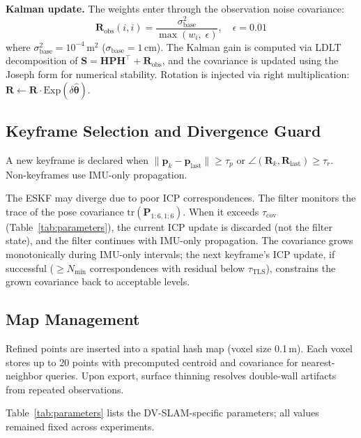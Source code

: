 \documentclass[journal]{IEEEtran}
\begin{document}
\textbf{Kalman update.} The weights enter through the observation noise covariance:
\begin{equation}
    \mathbf{R}_{\text{obs}}(i,i) = \frac{\sigma_{\text{base}}^2}{\max(w_i,\;\epsilon)}, \quad \epsilon = 0.01
    \label{eq:Robs}
\end{equation}
where $\sigma_{\text{base}}^2 = 10^{-4}$\,m$^2$ ($\sigma_{\text{base}} = 1$\,cm). The Kalman gain is computed via LDLT decomposition of $\mathbf{S} = \mathbf{H}\mathbf{P}\mathbf{H}^\top + \mathbf{R}_{\text{obs}}$, and the covariance is updated using the Joseph form for numerical stability. Rotation is injected via right multiplication: $\mathbf{R} \leftarrow \mathbf{R} \cdot \text{Exp}(\delta\hat{\boldsymbol{\theta}})$.

\subsection{Keyframe Selection and Divergence Guard}
\label{sec:divergence}

A new keyframe is declared when $\|\mathbf{p}_k - \mathbf{p}_{\text{last}}\| \geq \tau_p$ or $\angle(\mathbf{R}_k, \mathbf{R}_{\text{last}}) \geq \tau_r$. Non-keyframes use IMU-only propagation.

The ESKF may diverge due to poor ICP correspondences. The filter monitors the trace of the pose covariance $\text{tr}(\mathbf{P}_{1:6,1:6})$. When it exceeds $\tau_{\text{cov}}$ (Table~\ref{tab:parameters}), the current ICP update is discarded (not the filter state), and the filter continues with IMU-only propagation. The covariance grows monotonically during IMU-only intervals; the next keyframe's ICP update, if successful ($\geq N_{\min}$ correspondences with residual below $\tau_{\text{TLS}}$), constrains the grown covariance back to acceptable levels.

\subsection{Map Management}
\label{sec:map}

Refined points are inserted into a spatial hash map (voxel size 0.1\,m). Each voxel stores up to 20 points with precomputed centroid and covariance for nearest-neighbor queries. Upon export, surface thinning resolves double-wall artifacts from repeated observations.

Table~\ref{tab:parameters} lists the DV-SLAM-specific parameters; all values remained fixed across experiments.
\end{document}
